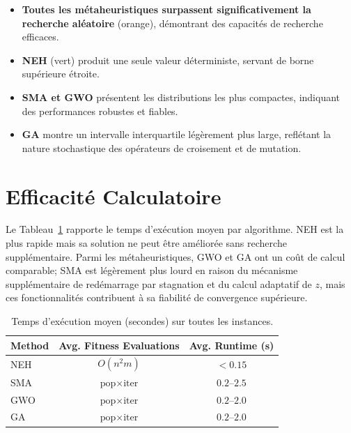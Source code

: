 \documentclass[12pt,a4paper,oneside]{report}
\begin{document}
\begin{itemize}[itemsep=4pt]
    \item \textbf{Toutes les m\'etaheuristiques surpassent significativement la recherche al\'eatoire} (orange), d\'emontrant des capacit\'es de recherche efficaces.
    \item \textbf{NEH} (vert) produit une seule valeur d\'eterministe, servant de borne sup\'erieure \'etroite.
    \item \textbf{SMA et GWO} pr\'esentent les distributions les plus compactes, indiquant des performances robustes et fiables.
    \item \textbf{GA} montre un intervalle interquartile l\'eg\`erement plus large, refl\'etant la nature stochastique des op\'erateurs de croisement et de mutation.
\end{itemize}

\section{Efficacit\'e Calculatoire}

Le Tableau~\ref{tab:efficiency} rapporte le temps d'ex\'ecution moyen par algorithme. NEH est la plus rapide mais sa solution ne peut \^etre am\'elior\'ee sans recherche suppl\'ementaire. Parmi les m\'etaheuristiques, GWO et GA ont un co\^ut de calcul comparable; SMA est l\'eg\`erement plus lourd en raison du m\'ecanisme suppl\'ementaire de red\'emarrage par stagnation et du calcul adaptatif de $z$, mais ces fonctionnalit\'es contribuent \`a sa fiabilit\'e de convergence sup\'erieure.

\begin{table}[H]
\centering
\caption{Temps d'ex\'ecution moyen (secondes) sur toutes les instances.}
\label{tab:efficiency}
\begin{tabular}{@{}lcc@{}}
\toprule
\textbf{Method} & \textbf{Avg. Fitness Evaluations} & \textbf{Avg. Runtime (s)} \\
\midrule
NEH & $O(n^2 m)$ & $< 0.15$ \\
SMA & $\text{pop} \times \text{iter}$ & $0.2$--$2.5$ \\
GWO & $\text{pop} \times \text{iter}$ & $0.2$--$2.0$ \\
GA  & $\text{pop} \times \text{iter}$ & $0.2$--$2.0$ \\
\bottomrule
\end{tabular}
\end{table}
\end{document}
